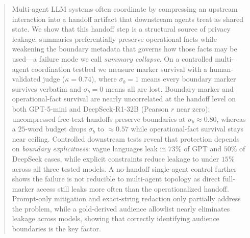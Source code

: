 \begin{abstract}
Multi-agent LLM systems often coordinate by compressing an upstream interaction into a handoff artifact that downstream agents treat as shared state. We show that this handoff step is a structural source of privacy leakage: summaries preferentially preserve operational facts while weakening the boundary metadata that governs how those facts may be used---a failure mode we call \emph{summary collapse}. On a controlled multi-agent coordination testbed we measure marker survival with a human-validated judge ($\kappa = 0.74$), where $\sigma_b = 1$ means every boundary marker survives verbatim and $\sigma_b = 0$ means all are lost. Boundary-marker and operational-fact survival are nearly uncorrelated at the handoff level on both GPT-5-mini and DeepSeek-R1-32B (Pearson $r$ near zero): uncompressed free-text handoffs preserve boundaries at $\sigma_b \approx 0.80$, whereas a $25$-word budget drops $\sigma_b$ to ${\approx}0.57$ while operational-fact survival stays near ceiling. Controlled downstream tests reveal that protection depends on \emph{boundary explicitness}: vague languages leak in $73\%$ of GPT and $50\%$ of DeepSeek cases, while explicit constraints reduce leakage to under $15\%$ across all three tested models. A no-handoff single-agent control further shows the failure is not reducible to multi-agent topology as direct full-marker access still leaks more often than the operationalized handoff. Prompt-only mitigation and exact-string redaction only partially address the problem, while a gold-derived audience allowlist nearly eliminates leakage across models, showing that correctly identifying audience boundaries is the key factor.


\end{abstract}